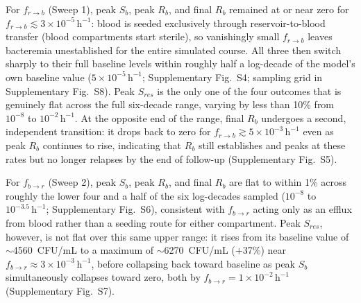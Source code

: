 \documentclass[11pt]{article}
\begin{document}
For $f_{r \to b}$ (Sweep 1), peak $S_b$, peak $R_b$, and final $R_b$
remained at or near zero for $f_{r \to b} \lesssim
3\times10^{-5}\,\mathrm{h}^{-1}$: blood is seeded exclusively through
reservoir-to-blood transfer (blood compartments start sterile), so
vanishingly small $f_{r \to b}$ leaves bacteremia unestablished for the
entire simulated course. All three then switch sharply to their full
baseline levels within roughly half a log-decade of the model's own
baseline value ($5\times10^{-5}\,\mathrm{h}^{-1}$; Supplementary Fig.~S4;
sampling grid in Supplementary Fig.~S8). Peak $S_{res}$ is the only one of
the four outcomes that is genuinely flat across the full six-decade range,
varying by less than 10\% from $10^{-8}$ to $10^{-2}\,\mathrm{h}^{-1}$. At
the opposite end of the range, final $R_b$ undergoes a second, independent
transition: it drops back to zero for $f_{r \to b} \gtrsim
5\times10^{-3}\,\mathrm{h}^{-1}$ even as peak $R_b$ continues to rise,
indicating that $R_b$ still establishes and peaks at these rates but no
longer relapses by the end of follow-up (Supplementary Fig.~S5).

For $f_{b \to r}$ (Sweep 2), peak $S_b$, peak $R_b$, and final $R_b$ are
flat to within 1\% across roughly the lower four and a half of the six
log-decades sampled ($10^{-8}$ to $10^{-3.5}\,\mathrm{h}^{-1}$;
Supplementary Fig.~S6), consistent with $f_{b \to r}$ acting only as an
efflux from blood rather than a seeding route for either compartment. Peak
$S_{res}$, however, is not flat over this same upper range: it rises from
its baseline value of $\sim$4560~CFU/mL to a maximum of $\sim$6270~CFU/mL
($+$37\%) near $f_{b \to r} \approx 3\times10^{-3}\,\mathrm{h}^{-1}$, before
collapsing back toward baseline as peak $S_b$ simultaneously collapses
toward zero, both by $f_{b \to r} = 1\times10^{-2}\,\mathrm{h}^{-1}$
(Supplementary Fig.~S7).
\end{document}
